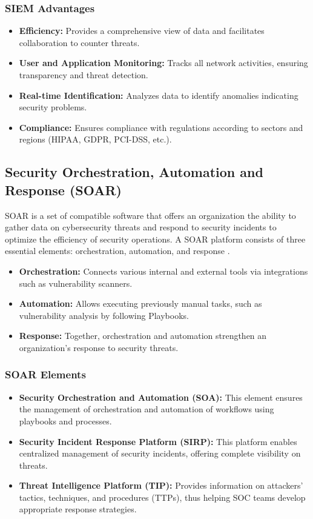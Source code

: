 \subsubsection{SIEM Advantages}

\begin{itemize}
    \item \textbf{Efficiency:} Provides a comprehensive view of data and facilitates collaboration to counter threats.
    \item \textbf{User and Application Monitoring:} Tracks all network activities, ensuring transparency and threat detection.
    \item \textbf{Real-time Identification:} Analyzes data to identify anomalies indicating security problems.
    \item \textbf{Compliance:} Ensures compliance with regulations according to sectors and regions (HIPAA, GDPR, PCI-DSS, etc.).
\end{itemize}

\subsection{Security Orchestration, Automation and Response (SOAR)}
\label{subsec:soar}

SOAR is a set of compatible software that offers an organization the ability to gather data on cybersecurity threats and respond to security incidents to optimize the efficiency of security operations. A SOAR platform consists of three essential elements: orchestration, automation, and response \cite{ref35} \cite{ref36}.

\begin{itemize}
    \item \textbf{Orchestration:} Connects various internal and external tools via integrations such as vulnerability scanners.
    \item \textbf{Automation:} Allows executing previously manual tasks, such as vulnerability analysis by following Playbooks.
    \item \textbf{Response:} Together, orchestration and automation strengthen an organization's response to security threats.
\end{itemize}

\subsubsection{SOAR Elements}

\begin{itemize}
    \item \textbf{Security Orchestration and Automation (SOA):} This element ensures the management of orchestration and automation of workflows using playbooks and processes.
    \item \textbf{Security Incident Response Platform (SIRP):} This platform enables centralized management of security incidents, offering complete visibility on threats.
    \item \textbf{Threat Intelligence Platform (TIP):} Provides information on attackers' tactics, techniques, and procedures (TTPs), thus helping SOC teams develop appropriate response strategies.
\end{itemize}


